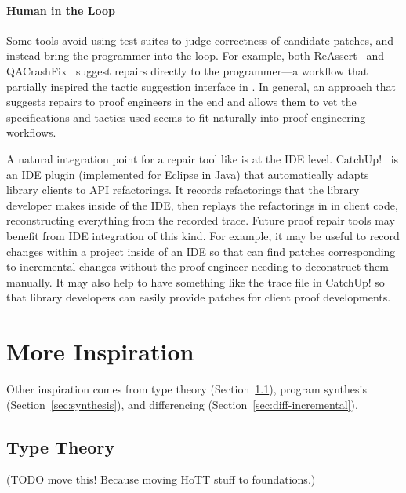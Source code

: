 \paragraph{Human in the Loop}
Some tools avoid using test suites to judge correctness of candidate patches, and instead
bring the programmer into the loop. For example, both ReAssert~\cite{daniel2009reassert}
and QACrashFix~\cite{gao2015fixing} suggest repairs directly to the programmer---a workflow
that partially inspired the tactic suggestion interface in \toolnamec.
In general, an approach that suggests repairs to proof engineers in the end
and allows them to vet the specifications and tactics used seems to fit naturally into proof engineering workflows. 

A natural integration point for a repair tool like \sysnamelong is at the IDE level. 
CatchUp!~\cite{Henkel:2005:CCR:1062455.1062512} is an IDE plugin (implemented for Eclipse in Java) that automatically adapts library clients to API refactorings.
It records refactorings that the library developer makes inside of the IDE,
then replays the refactorings in in client code, reconstructing everything from the recorded trace.
Future proof repair tools may benefit from IDE integration of this kind.
For example, it may be useful to record changes within a project inside of an IDE 
so that \sysnamelong can find patches corresponding to incremental changes without the proof engineer needing to deconstruct them manually.
It may also help to have something like the trace file in CatchUp! so that library developers can easily provide patches for client proof developments.

\iffalse
\section{More Inspiration}
\label{sec:inspiration}

Other inspiration comes from type theory (Section~\ref{sec:typetheory}),
program synthesis (Section~\ref{sec:synthesis}),
and differencing (Section~\ref{sec:diff-incremental}).


\subsection{Type Theory}
\label{sec:typetheory}

(TODO move this! Because moving HoTT stuff to foundations.)

